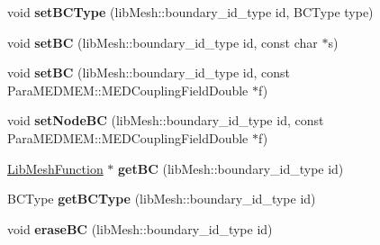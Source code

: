 \begin{DoxyCompactItemize}
\item 
\hypertarget{class_equation_systems_extended_afa4ffe19c645d92af2aa4d4c7b799d07}{void {\bfseries set\-B\-C\-Type} (lib\-Mesh\-::boundary\-\_\-id\-\_\-type id, B\-C\-Type type)}\label{class_equation_systems_extended_afa4ffe19c645d92af2aa4d4c7b799d07}

\item 
\hypertarget{class_equation_systems_extended_ae1bbab9028311dc3a2ef2297905311b8}{void {\bfseries set\-B\-C} (lib\-Mesh\-::boundary\-\_\-id\-\_\-type id, const char $\ast$s)}\label{class_equation_systems_extended_ae1bbab9028311dc3a2ef2297905311b8}

\item 
\hypertarget{class_equation_systems_extended_a75fc3126e55a2e6969c14926ee896299}{void {\bfseries set\-B\-C} (lib\-Mesh\-::boundary\-\_\-id\-\_\-type id, const Para\-M\-E\-D\-M\-E\-M\-::\-M\-E\-D\-Coupling\-Field\-Double $\ast$f)}\label{class_equation_systems_extended_a75fc3126e55a2e6969c14926ee896299}

\item 
\hypertarget{class_equation_systems_extended_af214009f1b614348b2c667ca55738373}{void {\bfseries set\-Node\-B\-C} (lib\-Mesh\-::boundary\-\_\-id\-\_\-type id, const Para\-M\-E\-D\-M\-E\-M\-::\-M\-E\-D\-Coupling\-Field\-Double $\ast$f)}\label{class_equation_systems_extended_af214009f1b614348b2c667ca55738373}

\item 
\hypertarget{class_equation_systems_extended_a2d7a946924a8a4a4f477a448cbe836d7}{\hyperlink{class_lib_mesh_function}{Lib\-Mesh\-Function} $\ast$ {\bfseries get\-B\-C} (lib\-Mesh\-::boundary\-\_\-id\-\_\-type id)}\label{class_equation_systems_extended_a2d7a946924a8a4a4f477a448cbe836d7}

\item 
\hypertarget{class_equation_systems_extended_a232ed47ce6bc9c48f42c8a38ccbbe0fd}{B\-C\-Type {\bfseries get\-B\-C\-Type} (lib\-Mesh\-::boundary\-\_\-id\-\_\-type id)}\label{class_equation_systems_extended_a232ed47ce6bc9c48f42c8a38ccbbe0fd}

\item 
\hypertarget{class_equation_systems_extended_aadc09201591129a63422e12dbcb7c779}{void {\bfseries erase\-B\-C} (lib\-Mesh\-::boundary\-\_\-id\-\_\-type id)}\label{class_equation_systems_extended_aadc09201591129a63422e12dbcb7c779}

\end{DoxyCompactItemize}
